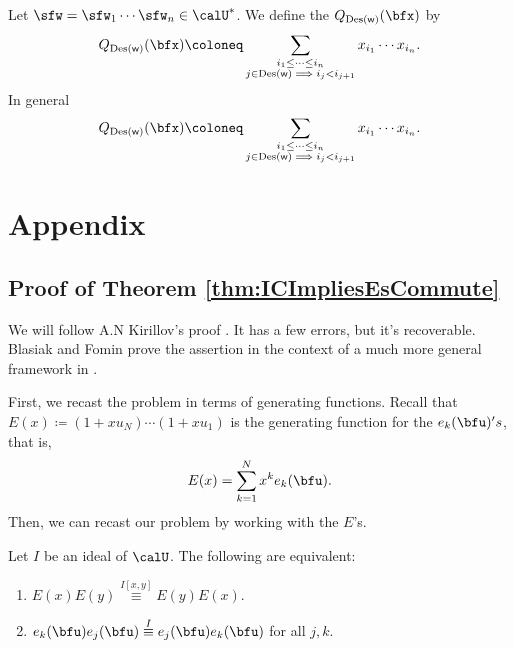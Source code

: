 \documentclass{article}
\newcommand*\Des{\operatorname{Des}}
\begin{document}
\begin{definition}
    Let $\sfw = \sfw_1\cdots\sfw_n \in \calU^\ast$.
    We define the  $Q_{\Des(\sf w)}(\bfx)$ by
    \[
        Q_{\Des(\sf w)}(\bfx)
        \coloneq
        \sum_{
            \substack{
                i_1 \leq \cdots \leq i_n \\
                j \in \Des({\sf w}) \implies i_j < i_{j+1}
            }
        }
        x_{i_1} \cdots x_{i_n}.
    \]
    In general
    \[
        Q_{\Des(\sf w)}(\bfx)
        \coloneq
        \sum_{
            \substack{
                i_1 \leq \cdots \leq i_n \\
                j \in \Des({\sf w}) \implies i_j < i_{j+1}
            }
        }
        x_{i_1} \cdots x_{i_n}.
    \]
\end{definition}


\section{Appendix}

\subsection{Proof of Theorem \ref{thm:ICImpliesEsCommute}}
\label{subsec:I_CImpliesEsCommuteProof}

We will follow A.N Kirillov's proof \cite[Theorem 2.26]{K16}.
It has a few errors, but it's recoverable.
Blasiak and Fomin prove the assertion in the context of a much more general framework in \cite{BF18}.

First, we recast the problem in terms of generating functions.
Recall that $E(x) \coloneq (1+xu_N) \cdots (1+xu_1)$ is the generating function for the $e_k(\bfu)'s$, that is,
\[
    E(x) 
    = 
    \sum_{k=1}^N
    x^k
    e_k(\bfu).
\]
Then, we can recast our problem by working with the $E$'s.
\begin{lemma}
    \label{lem:ElementariesCommuteIffECommutes}
    Let $I$ be an ideal of $\calU$.
    The following are equivalent:
    \begin{enumerate}[label=(\alph*)]
        \item 
            $E(x)E(y) \overset{I[x,y]}{\equiv} E(y)E(x)$.
        \item 
            $e_k(\bfu)e_j(\bfu) \overset{I}{\equiv} e_j(\bfu)e_k(\bfu)$ for all $j,k$. 
    \end{enumerate}
\end{lemma}
\end{document}
